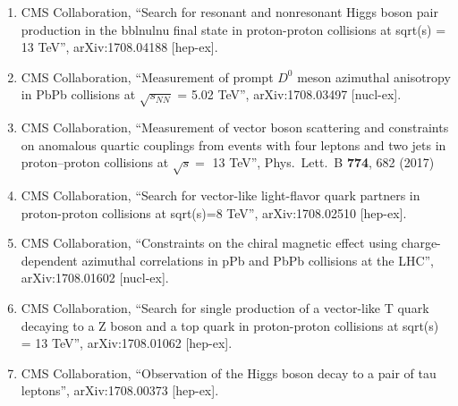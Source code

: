 \begin{enumerate}
\item CMS Collaboration, ``Search for resonant and nonresonant Higgs boson pair production in the bblnulnu final state in proton-proton collisions at sqrt(s) = 13 TeV'', arXiv:1708.04188 [hep-ex].

\item CMS Collaboration, ``Measurement of prompt $D^0$ meson azimuthal anisotropy in PbPb collisions at $\sqrt{{s}_{NN}}$ = 5.02 TeV'', arXiv:1708.03497 [nucl-ex].

\item CMS Collaboration, ``Measurement of vector boson scattering and constraints on anomalous quartic couplings from events with four leptons and two jets in proton–proton collisions at $\sqrt{s}=$ 13 TeV'', Phys.\ Lett.\ B {\bf 774}, 682 (2017)

\item CMS Collaboration, ``Search for vector-like light-flavor quark partners in proton-proton collisions at sqrt(s)=8 TeV'', arXiv:1708.02510 [hep-ex].

\item CMS Collaboration, ``Constraints on the chiral magnetic effect using charge-dependent azimuthal correlations in pPb and PbPb collisions at the LHC'', arXiv:1708.01602 [nucl-ex].

\item CMS Collaboration, ``Search for single production of a vector-like T quark decaying to a Z boson and a top quark in proton-proton collisions at sqrt(s) = 13 TeV'', arXiv:1708.01062 [hep-ex].

\item CMS Collaboration, ``Observation of the Higgs boson decay to a pair of tau leptons'', arXiv:1708.00373 [hep-ex].


\end{enumerate}
